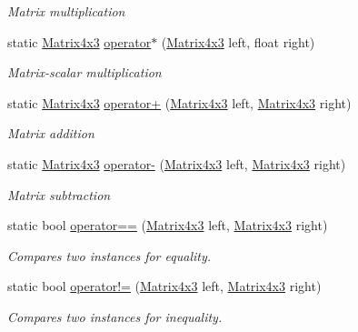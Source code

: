 \begin{DoxyCompactItemize}
\begin{DoxyCompactList}\small\item\em Matrix multiplication \end{DoxyCompactList}\item 
static \hyperlink{struct_open_t_k_1_1_matrix4x3}{Matrix4x3} \hyperlink{struct_open_t_k_1_1_matrix4x3_a39e58296d47a61fe0bca80b6cf878b35}{operator$\ast$} (\hyperlink{struct_open_t_k_1_1_matrix4x3}{Matrix4x3} left, float right)
\begin{DoxyCompactList}\small\item\em Matrix-\/scalar multiplication \end{DoxyCompactList}\item 
static \hyperlink{struct_open_t_k_1_1_matrix4x3}{Matrix4x3} \hyperlink{struct_open_t_k_1_1_matrix4x3_a8a5d0da5d0b14e681b70cf5a35a0e973}{operator+} (\hyperlink{struct_open_t_k_1_1_matrix4x3}{Matrix4x3} left, \hyperlink{struct_open_t_k_1_1_matrix4x3}{Matrix4x3} right)
\begin{DoxyCompactList}\small\item\em Matrix addition \end{DoxyCompactList}\item 
static \hyperlink{struct_open_t_k_1_1_matrix4x3}{Matrix4x3} \hyperlink{struct_open_t_k_1_1_matrix4x3_a8d3669c00bb5f9e26c8904f5f9ddc487}{operator-\/} (\hyperlink{struct_open_t_k_1_1_matrix4x3}{Matrix4x3} left, \hyperlink{struct_open_t_k_1_1_matrix4x3}{Matrix4x3} right)
\begin{DoxyCompactList}\small\item\em Matrix subtraction \end{DoxyCompactList}\item 
static bool \hyperlink{struct_open_t_k_1_1_matrix4x3_a84faa77d70899b47121b53e6ec17cf75}{operator==} (\hyperlink{struct_open_t_k_1_1_matrix4x3}{Matrix4x3} left, \hyperlink{struct_open_t_k_1_1_matrix4x3}{Matrix4x3} right)
\begin{DoxyCompactList}\small\item\em Compares two instances for equality. \end{DoxyCompactList}\item 
static bool \hyperlink{struct_open_t_k_1_1_matrix4x3_a590a41bbafad4f3e7419a4d68f0d7fb7}{operator!=} (\hyperlink{struct_open_t_k_1_1_matrix4x3}{Matrix4x3} left, \hyperlink{struct_open_t_k_1_1_matrix4x3}{Matrix4x3} right)
\begin{DoxyCompactList}\small\item\em Compares two instances for inequality. \end{DoxyCompactList}\end{DoxyCompactItemize}
